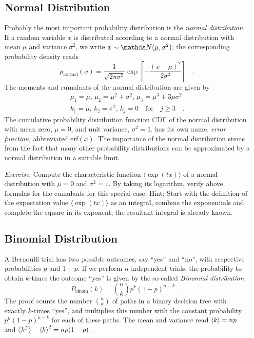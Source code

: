 \documentclass{notebook}
\newcommand{\Exercise}{\textit{Exercise}}
\begin{document}
\subsection*{Normal Distribution}
Probably the most important probability distribution is the \textit{normal distribution}.
If a random variable $x$ is distributed according to a normal distribution with mean $\mu$ and variance $\sigma^2$,
we write $x\sim\N(\mu, \sigma^2)$; 
the corresponding probability density reads
\begin{equation}
p_\mathrm{normal}(x) = \frac{1}{\sqrt{2 \pi \sigma^2}} \exp[- \frac{(x- \mu)^2}{2 \sigma^2}] \quad.
\end{equation}
The moments and cumulants of the normal distribution are given by
\begin{gather*}
	\mu_1 = \mu, \, \mu_2 = \mu^2 + \sigma^2, \, \mu_3 = \mu^3 + 3 \mu \sigma^2 \\
	k_1 = \mu, \, k_2 = \sigma^2, \, k_j = 0 \quad \mathrm{for} \quad j \geq 3 \quad.
\end{gather*}
The cumulative probability distribution function CDF of the normal distribution 
with mean zero, $\mu=0$, and unit variance, $\sigma^2=1$,
has its own name, \textit{error function}, abbreviated $\mathrm{erf}(x)$.
The importance of the normal distribution stems from the fact that 
many other probability distributions can be approximated by a normal distribution in a suitable limit.

\Exercise: Compute the characteristic function 
$\langle \exp(tx) \rangle$
of a normal distribution with $\mu=0$ and $\sigma^2=1$.
By taking its logarithm, verify above formulas for the cumulants for this special case.
Hint: 
Start with the definition of the expectation value $\langle \exp(tx) \rangle$ as an integral,
combine the exponentials and complete the square in its exponent;
the resultant integral is already known.

\subsection*{Binomial Distribution}
A Bernoulli trial has two possible outcomes, say ``yes'' and ``no'', with respective probabilities $p$ and $1 - p$. 
If we perform $n$ independent trials, the probability to obtain $k$-times the outcome ``yes'' is given by
the so-called \textit{Binomial distribution}
\begin{equation}
P_\mathrm{binom}(k) = \binom{n}{k} p^k (1 - p)^{n - k} \quad.
\end{equation}
The proof counts the number $\binom{n}{k}$ of paths in a binary decision tree with exactly $k$-times ``yes'', 
and multiplies this number with the constant probability $p^k(1-p)^{n-k}$ for each of these paths.
The mean and variance read $\expval{k} = n p$ and $\expval{k^2} - \expval{k}^2 = n p (1 - p)$. 
\end{document}
